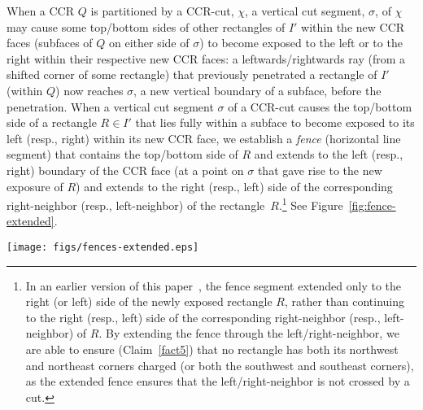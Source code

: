 \documentclass{article}
\begin{document}
When a CCR $Q$ is partitioned by a CCR-cut, $\chi$, a vertical cut
segment, $\sigma$, of $\chi$ may cause some top/bottom sides of other
rectangles of $I'$ within the new CCR faces (subfaces of $Q$ on either
side of $\sigma$) to become exposed to the left or to the right within
their respective new CCR faces: a leftwards/rightwards ray (from a shifted corner of
some rectangle) that previously penetrated a rectangle of $I'$ (within $Q$) now reaches $\sigma$,
a new vertical boundary of a subface, before the penetration.
%
When a vertical cut segment $\sigma$ of a CCR-cut causes the
top/bottom side of a rectangle $R\in I'$ that lies fully within a
subface to become exposed to its left (resp., right) within its new
CCR face, we establish a {\em fence} (horizontal line segment) that
contains the top/bottom side of $R$ and extends to the left (resp.,
right) boundary of the CCR face (at a point on $\sigma$ that gave rise
to the new exposure of $R$) and extends to the right (resp., left)
side of the corresponding right-neighbor (resp., left-neighbor) of the
rectangle~$R$.\footnote{In an earlier version of this
  paper~\cite{DBLP:journals/corr/abs-2101-00326}, the fence segment
  extended only to the right (or left) side of the newly exposed
  rectangle $R$, rather than continuing to the right (resp., left) side of
  the corresponding right-neighbor (resp., left-neighbor) of $R$.  By extending the fence through the left/right-neighbor,
  we are able to ensure (Claim~\ref{fact5}) that no rectangle has both
  its northwest and northeast corners charged (or both the southwest
  and southeast corners), as the extended fence ensures that the
  left/right-neighbor is not crossed by a cut.} See
Figure~\ref{fig:fence-extended}.

\begin{figure*}[!ht]
	\centering
	\texttt{[image: figs/fences-extended.eps]}
	\caption{Examples showing the establishment of fences after a
          cut along vertical segment $\sigma$ causes the northwest
          corner (left and right cases) or the southwest corner
          (middle case) of $R$ to become exposed to the left. The newly
          established fence segment is shown in red, extending from
          $\sigma$ to the right side of $R_r$, the top-right-neighbor
          (left and right cases) or bottom-right-neighbor (middle
          case).}
        \label{fig:fence-extended}
\end{figure*}
\end{document}
